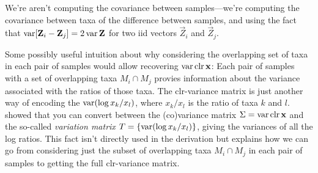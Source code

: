 We're aren't computing the covariance between samples---we're computing the
covariance between taxa of the difference between samples, and using the fact
that $\operatorname{var} [\mathbf{Z}_i - \mathbf{Z}_j] = 2 \operatorname{var} \mathbf{Z}$ for two iid vectors $\vec
Z_i$ and $\vec Z_j$. 

Some possibly useful intuition about why considering the overlapping set of
taxa in each pair of samples would allow recovering $\operatorname{var} \operatorname{clr} \mathbf{x}$: Each
pair of samples with a set of overlapping taxa $M_i \cap M_j$ provies
information about the variance associated with the ratios of those taxa. The
clr-variance matrix is just another way of encoding the $\operatorname{var}(\log x_k/x_l)$,
where $x_k/x_l$ is the ratio of taxa $k$ and $l$. \textcite{Aitchison1986}
showed that you can convert between the (co)variance matrix $\Sigma = \operatorname{var} \operatorname{clr}
\mathbf{x}$ and the so-called \emph{variation matrix} $T = \{\operatorname{var}(\log x_k/x_l)\}$,
giving the variances of all the log ratios. This fact isn't directly used in
the derivation but explains how we can go from considering just the subset of
overlapping taxa $M_i\cap M_j$ in each pair of samples to getting the full
clr-variance matrix.

\printbibliography


